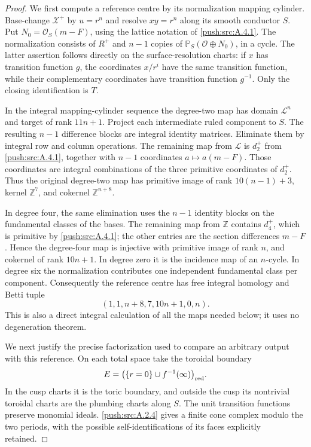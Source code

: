 \begin{proof}
We first compute a reference centre by its normalization
mapping cylinder. Base-change $\mathcal X^+$ by $u=r^n$
and resolve $xy=r^n$ along its smooth conductor $S$.
Put $N_0=\mathcal O_S(m-F)$, using the lattice notation
of \ref{push:src:A.4.1}. The normalization consists of $R^+$ and
$n-1$ copies of $\mathbb P_S(\mathcal O\oplus N_0)$,
in a cycle. The latter assertion follows directly on
the surface-resolution charts: if $x$ has transition
function $g$, the coordinates $x/r^i$ have the same
transition function, while their complementary
coordinates have transition function $g^{-1}$.
Only the closing identification is $T$.

In the integral mapping-cylinder sequence the degree-two
map has domain $\mathcal L^n$ and target of rank $11n+1$.
Project each intermediate ruled component to $S$.
The resulting $n-1$ difference blocks are integral
identity matrices. Eliminate them by integral row and
column operations. The remaining map from $\mathcal L$
is $d_2^+$ from \ref{push:src:A.4.1}, together with $n-1$ coordinates
$a\mapsto a(m-F)$. Those coordinates are integral
combinations of the three primitive coordinates of
$d_2^+$. Thus the original degree-two map has primitive
image of rank $10(n-1)+3$, kernel $\mathbb Z^7$, and
cokernel $\mathbb Z^{n+8}$.

In degree four, the same elimination uses the $n-1$
identity blocks on the fundamental classes of the bases.
The remaining map from $\mathbb Z$ contains $d_4^+$,
which is primitive by \ref{push:src:A.4.1}; the other entries are the
section differences $m-F$. Hence the degree-four map
is injective with primitive image of rank $n$, and
cokernel of rank $10n+1$. In degree zero it is the
incidence map of an $n$-cycle. In degree six the
normalization contributes one independent fundamental
class per component. Consequently the reference centre
has free integral homology and Betti tuple
\[
 (1,1,n+8,7,10n+1,0,n).
\]
This is also a direct integral calculation of all the
maps needed below; it uses no degeneration theorem.

We next justify the precise factorization used to compare
an arbitrary output with this reference. On each total
space take the toroidal boundary
\[
 E=\bigl(\{r=0\}\cup f^{-1}(\infty)\bigr)_{\rm red}.
\]
In the cusp charts it is the toric boundary, and outside
the cusp its nontrivial toroidal charts are the plumbing
charts along $S$. The unit transition functions preserve
monomial ideals. \ref{push:src:A.2.4} gives a finite cone complex modulo
the two periods, with the possible self-identifications
of its faces explicitly retained.


\end{proof}

